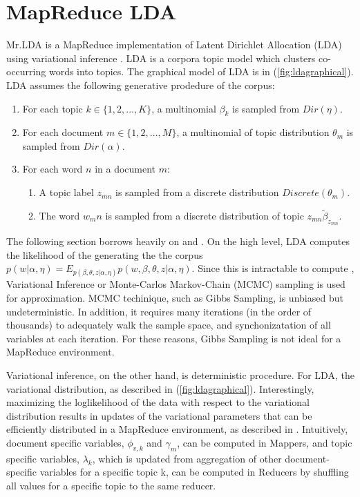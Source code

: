 \documentclass{acm_proc_article-sp}
\begin{document}
\section{MapReduce LDA}\label{sec:mrlda}
Mr.LDA is a MapReduce implementation of Latent Dirichlet Allocation (LDA) using variational inference \cite{mrlda}. LDA is a corpora topic model which clusters co-occurring words into topics. The graphical model of LDA is in (\ref{fig:ldagraphical}). LDA assumes the following generative prodedure of the corpus:

\begin{enumerate}
\item For each topic $k \in \{1,2,...,K\}$, a multinomial $\beta_k$ is sampled from $Dir(\eta)$.
\item For each document $m \in \{1,2,...,M\}$, a multinomial of topic distribution $\theta_m$ is sampled from $Dir(\alpha)$.
\item For each word $n$ in a document $m$:
\begin{enumerate}
	\item A topic label $z_{mn}$ is sampled from a discrete distribution $Discrete(\theta_m)$.
	\item The word $w_mn$ is sampled from a discrete distribution of topic $z_{mn} \tilde \beta_{z_{mn}}$.
\end{enumerate}
\end{enumerate}

The following section borrows heavily on \cite{Blei03latentdirichlet} and \cite{mrlda}. On the high level, LDA computes the likelihood of the generating the the corpus $p(w | \alpha, \eta) = E_{p(\beta, \theta, z | \alpha, \eta)} p(w, \beta, \theta, z | \alpha, \eta)$. Since this is intractable to compute \cite{Blei03latentdirichlet}, Variational Inference or Monte-Carlos Markov-Chain (MCMC) sampling is used for approximation. MCMC techinique, such as Gibbs Sampling, is unbiased but undeterministic. In addition, it requires many iterations (in the order of thousands) to adequately walk the sample space, and synchonizatation of all variables at each iteration. For these reasons, Gibbs Sampling is not ideal for a MapReduce environment.

Variational inference, on the other hand, is deterministic procedure. For LDA, the variational distribution, as described in (\ref{fig:ldagraphical}). Interestingly, maximizing the loglikelihood of the data with respect to the variational distribution results in updates of the variational parameters that can be efficiently distributed in a MapReduce environment, as described in \cite{mrlda}. Intuitively, document specific variables, $\phi_{v,k}$ and $\gamma_m$, can be computed in Mappers, and topic specific variables, $\lambda_k$, which is updated from aggregation of other document-specific variables for a specific topic k, can be computed in Reducers by shuffling all values for a specific topic to the same reducer.
\end{document}
